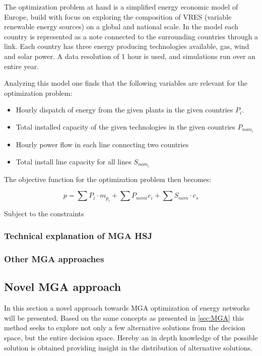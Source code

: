 The optimization problem at hand is a simplified energy economic model of Europe, build with focus on exploring the composition of VRES (variable renewable energy sources) on a global and national scale. In the model each country is represented as a note connected to the surrounding countries through a link. Each country has three energy producing technologies available, gas, wind and solar power. A data resolution of 1 hour is used, and simulations run over an entire year. 

Analyzing this model one finds that the following variables are relevant for the optimization problem:

\begin{itemize}
    \item Hourly dispatch of energy from the given plants in the given countries $P_i$.
    \item Total installed capacity of the given technologies in the given countries $P_{nom_i}$
    \item Hourly power flow in each line connecting two countries
    \item Total install line capacity for all lines $S_{nom_i}$

\end{itemize}

The objective function for the optimization problem then becomes: 

\begin{equation}
    p = \sum P_i \cdot m_{p_i} + \sum P_{nom i} c_i + \sum S_{nom} \cdot c_s 
\end{equation}{}

Subject to the constraints 


\subsubsection{Technical explanation of MGA HSJ}

\subsubsection{Other MGA approaches}

\subsection{Novel MGA approach}
In this section a novel approach towards MGA optimization of energy networks will be presented. Based on the same concepts as presented in \ref{sec:MGA} this method seeks to explore not only a few alternative solutions from the decision space, but the entire decision space. Hereby an in depth knowledge of the possible solution is obtained providing insight in the distribution of alternative solutions. \\

